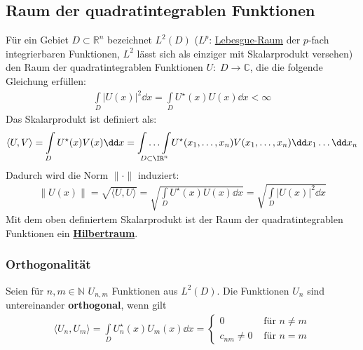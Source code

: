   \subsection{Raum der quadratintegrablen Funktionen}
	  Für ein Gebiet $D \subset \mathbb{R}^n$ bezeichnet $L^2(D)$ ($L^p$: \href{https://de.wikipedia.org/wiki/Lp-Raum}{Lebesgue-Raum} der $p$-fach integrierbaren Funktionen, $L^2$ lässt sich als einziger mit Skalarprodukt versehen) den Raum der quadratintegrablen Funktionen $U:\; D\to\mathbb{C}$, die die folgende Gleichung erfüllen:
	  \begin{equation}\begin{split}
			  \int\limits_D \left| U(x) \right|^2 \dd x = \int\limits_D  U^\star(x) U(x)  \dd x< \infty
		  \end{split}\end{equation}
	  Das Skalarprodukt ist definiert als:
	  \begin{equation}\begin{split}\label{FktSP}
			  \langle U, V\rangle = \int\limits_D U^\star(x)V(x) \dd x = \underset{D\subset\IR^n}{\int\dots\int}  U^\star(x_1,\dots,x_n)V(x_1,\dots,x_n) \dd x_1 \dots \dd x_n
		  \end{split}\end{equation}
	  Dadurch wird die Norm $\| \cdot \|$ induziert:
	  \begin{equation}\begin{split}
			  \| U(x) \| = \sqrt{\langle U, U\rangle} = \sqrt{\int\limits_D  U^\star(x) U(x)  \dd x} = \sqrt{\int\limits_D \left| U(x) \right|^2 \dd x}
		  \end{split}\end{equation}
	  Mit dem oben definiertem Skalarprodukt ist der Raum der quadratintegrablen Funktionen ein \href{https://de.wikipedia.org/wiki/Hilbertraum}{\textbf{Hilbertraum}}.
	  \subsubsection{Orthogonalität}
		  Seien für $n,m \in \mathbb{N}$ $U_{n,m}$ Funktionen aus $L^2(D)$. Die Funktionen $U_n$ sind untereinander \textbf{orthogonal}, wenn gilt
		  \begin{equation}\begin{split}
				  \langle U_n, U_m\rangle = \int\limits_D U_n^\star (x) U_m(x) \dd x =
				  \begin{cases}
					  0            & \text{ für } n\ne m \\
					  c_{nm}\neq 0 & \text{ für } n = m
				  \end{cases}
			  \end{split}\end{equation}

